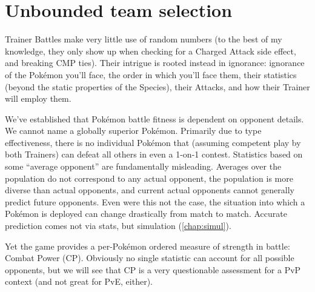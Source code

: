 \chapter{Unbounded team selection\label{chap:unbounded}}
Trainer Battles make very little use of random numbers (to the best of my
 knowledge, they only show up when checking for a Charged Attack side
 effect, and breaking CMP ties).
Their intrigue is rooted instead in ignorance: ignorance of
 the Pokémon you'll face, the order in which you'll face them,
 their statistics (beyond the static properties of the Species),
 their Attacks, and how their Trainer will employ them.

We've established that Pokémon battle fitness is dependent on opponent details.
We cannot name a globally superior Pokémon.
Primarily due to type effectiveness, there is no individual Pokémon that
  (assuming competent play by both Trainers) can defeat all others in even a
  1-on-1 contest.
Statistics based on some ``average opponent'' are fundamentally misleading.
Averages over the population do not correspond to any actual opponent,
 the population is more diverse than actual opponents,
 and current actual opponents cannot generally predict future opponents.
Even were this not the case, the situation into which a Pokémon is deployed
 can change drastically from match to match.
Accurate prediction comes not via stats, but simulation (\autoref{chap:simul}).

Yet the game provides a per-Pokémon ordered measure of strength in battle: Combat Power (CP).
Obviously no single statistic can account for all possible opponents, but
 we will see that CP is a very questionable assessment for a PvP
 context (and not great for PvE, either).

